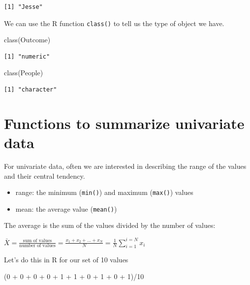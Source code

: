 \documentclass[
  letterpaper,
  DIV=11,
  numbers=noendperiod]{scrreprt}
\newenvironment{Shaded}{\begin{snugshade}}{\end{snugshade}}
\newcommand{\DecValTok}[1]{\textcolor[rgb]{0.68,0.00,0.00}{#1}}
\newcommand{\FunctionTok}[1]{\textcolor[rgb]{0.28,0.35,0.67}{#1}}
\newcommand{\NormalTok}[1]{\textcolor[rgb]{0.00,0.23,0.31}{#1}}
\newcommand{\SpecialCharTok}[1]{\textcolor[rgb]{0.37,0.37,0.37}{#1}}
\providecommand{\tightlist}{%
  \setlength{\itemsep}{0pt}\setlength{\parskip}{0pt}}\usepackage{longtable,booktabs,array}
\begin{document}
\begin{verbatim}
[1] "Jesse"
\end{verbatim}

We can use the R function \texttt{class()} to tell us the type of object
we have.

\begin{Shaded}
\begin{Highlighting}[]
\FunctionTok{class}\NormalTok{(Outcome)}
\end{Highlighting}
\end{Shaded}

\begin{verbatim}
[1] "numeric"
\end{verbatim}

\begin{Shaded}
\begin{Highlighting}[]
\FunctionTok{class}\NormalTok{(People)}
\end{Highlighting}
\end{Shaded}

\begin{verbatim}
[1] "character"
\end{verbatim}

\hypertarget{functions-to-summarize-univariate-data}{%
\section{Functions to summarize univariate
data}\label{functions-to-summarize-univariate-data}}

For univariate data, often we are interested in describing the range of
the values and their central tendency.

\begin{itemize}
\tightlist
\item
  range: the minimum (\texttt{min()}) and maximum (\texttt{max()})
  values
\item
  mean: the average value (\texttt{mean()})
\end{itemize}

The average is the sum of the values divided by the number of values:

\(\bar{X} = \frac{\text{sum of values}}{\text{number of values}} = \frac{x_1 + x_2 + ... + x_N}{N}=\frac{1}{N}\sum_{i=1}^{i=N} x_i\)

Let's do this in R for our set of 10 values

\begin{Shaded}
\begin{Highlighting}[]
\NormalTok{(}\DecValTok{0} \SpecialCharTok{+} \DecValTok{0} \SpecialCharTok{+} \DecValTok{0} \SpecialCharTok{+} \DecValTok{0} \SpecialCharTok{+} \DecValTok{1} \SpecialCharTok{+} \DecValTok{1} \SpecialCharTok{+} \DecValTok{0} \SpecialCharTok{+} \DecValTok{1} \SpecialCharTok{+} \DecValTok{0} \SpecialCharTok{+} \DecValTok{1}\NormalTok{)}\SpecialCharTok{/}\DecValTok{10}
\end{Highlighting}
\end{Shaded}
\end{document}
